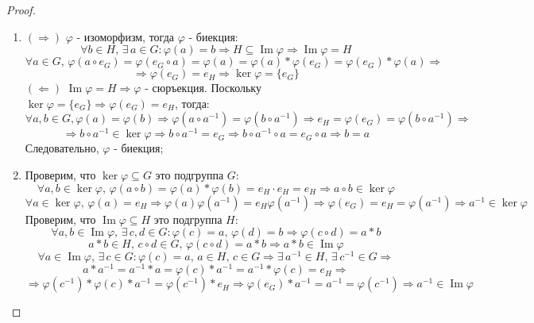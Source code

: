 \documentclass[12pt]{article}
\theoremstyle{definition}
\DeclareMathOperator{\Ima}{Im}
\begin{document}
\begin{proof}\hfill
	\begin{enumerate}[label=\arabic*)]
		\item $(\Rightarrow)$ $\varphi$ - изоморфизм, тогда $\varphi$ - биекция: 
		$$
			\forall b \in H, \, \exists \, a\in G \colon \varphi(a) = b \Rightarrow H \subseteq \Ima\varphi \Rightarrow \Ima\varphi = H
		$$
		$$
			\forall a \in G,\, \varphi(a\circ e_G) =  \varphi(e_G\circ a) =\varphi(a) = \varphi(a)*\varphi(e_G) = \varphi(e_G)*\varphi(a) \Rightarrow
		$$
		$$
			\Rightarrow \varphi(e_G) = e_H \Rightarrow \ker\varphi = \{e_G\}
		$$
		\newpage
		$(\Leftarrow)$ $\Ima\varphi = H \Rightarrow \varphi$ - сюръекция. Поскольку $\ker\varphi = \{e_G\} \Rightarrow \varphi(e_G) = e_H$, тогда:
		$$
			\forall a,b \in G, \varphi(a) = \varphi(b) \Rightarrow \varphi(a\circ a^{-1}) = \varphi(b\circ a^{-1}) \Rightarrow e_H = \varphi(e_G) = \varphi(b\circ a^{-1}) \Rightarrow
		$$
		$$
			\Rightarrow b\circ a^{-1} \in \ker\varphi \Rightarrow b\circ a^{-1} = e_G \Rightarrow b \circ a^{-1}\circ a = e_G \circ a \Rightarrow b = a
		$$
		Следовательно, $\varphi$ - биекция;
		\item Проверим, что $\ker\varphi \subseteq G$ это подгруппа $G$:
		$$
			\forall a,b \in \ker\varphi, \, \varphi(a\circ b) = \varphi(a)*\varphi(b) = e_H{\cdot}e_H = e_H \Rightarrow a\circ b \in \ker\varphi
		$$
		$$
			\forall a \in \ker\varphi, \, \varphi(a) = e_H \Rightarrow \varphi(a)\varphi(a^{-1}) = e_H\varphi(a^{-1}) \Rightarrow \varphi(e_G) = e_H = \varphi(a^{-1}) \Rightarrow a^{-1} \in \ker\varphi
		$$
		Проверим, что $\Ima\varphi \subseteq H$ это подгруппа $H$:
		$$
			\forall a,b \in \Ima\varphi, \, \exists \, c,d \in G \colon \varphi(c) = a, \, \varphi(d) = b \Rightarrow \varphi(c\circ d) = a * b
		$$
		$$
			a* b \in H,\, c \circ d \in G, \, \varphi(c\circ d) = a * b \Rightarrow a * b \in \Ima\varphi
		$$
		$$
			\forall a \in \Ima\varphi, \, \exists \, c \in G \colon \varphi(c) = a, \, a \in H, \, c\in G \Rightarrow \exists \, a^{-1} \in H, \, \exists \, c^{-1} \in G \Rightarrow
		$$
		$$	
			a*a^{-1} = a^{-1}*a = \varphi(c)*a^{-1} = a^{-1}*\varphi(c) = e_H \Rightarrow
		$$
		$$
			\Rightarrow \varphi(c^{-1})*\varphi(c)*a^{-1} = \varphi(c^{-1})*e_H \Rightarrow \varphi(e_G)*a^{-1} = a^{-1} = \varphi(c^{-1}) \Rightarrow a^{-1} \in \Ima\varphi
		$$
	\end{enumerate}
\end{proof}
\end{document}
